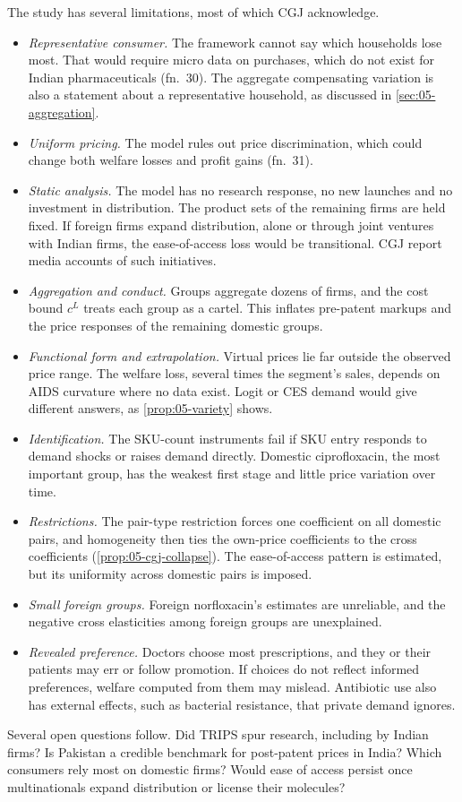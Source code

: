 The study has several limitations, most of which CGJ acknowledge.
\begin{itemize}
\item \emph{Representative consumer.} The framework cannot say which households lose most. That would require micro
data on purchases, which do not exist for Indian pharmaceuticals (fn.~30). The aggregate compensating variation is
also a statement about a representative household, as discussed in \cref{sec:05-aggregation}.
\item \emph{Uniform pricing.} The model rules out price discrimination, which could change both welfare losses and
profit gains (fn.~31).
\item \emph{Static analysis.} The model has no research response, no new launches and no investment in distribution.
The product sets of the remaining firms are held fixed. If foreign firms expand distribution, alone or through joint
ventures with Indian firms, the ease-of-access loss would be transitional. CGJ report media accounts of such
initiatives.
\item \emph{Aggregation and conduct.} Groups aggregate dozens of firms, and the cost bound $c^L$ treats each group as a
cartel. This inflates pre-patent markups and the price responses of the remaining domestic groups.
\item \emph{Functional form and extrapolation.} Virtual prices lie far outside the observed price range. The welfare
loss, several times the segment's sales, depends on AIDS curvature where no data exist. Logit or CES demand would
give different answers, as \cref{prop:05-variety} shows.
\item \emph{Identification.} The SKU-count instruments fail if SKU entry responds to demand shocks or raises demand
directly. Domestic ciprofloxacin, the most important group, has the weakest first stage and little price variation
over time.
\item \emph{Restrictions.} The pair-type restriction forces one coefficient on all domestic pairs, and homogeneity then
ties the own-price coefficients to the cross coefficients (\cref{prop:05-cgj-collapse}). The ease-of-access pattern is
estimated, but its uniformity across domestic pairs is imposed.
\item \emph{Small foreign groups.} Foreign norfloxacin's estimates are unreliable, and the negative cross elasticities
among foreign groups are unexplained.
\item \emph{Revealed preference.} Doctors choose most prescriptions, and they or their patients may err or follow
promotion. If choices do not reflect informed preferences, welfare computed from them may mislead. Antibiotic use also
has external effects, such as bacterial resistance, that private demand ignores.
\end{itemize}
Several open questions follow. Did TRIPS spur research, including by Indian firms? Is Pakistan a credible benchmark
for post-patent prices in India? Which consumers rely most on domestic firms? Would ease of access persist once
multinationals expand distribution or license their molecules?

